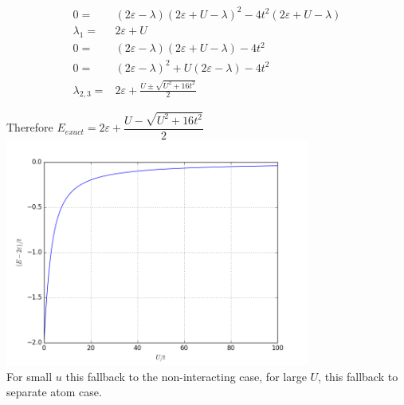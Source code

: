 \documentclass[10pt,fleqn]{article}
\newcommand{\eqar}[1]
{
  \begin{align*}
    #1
  \end{align*}
}
\newcommand{\paren}[1]{{\left({#1}\right)}}
\begin{document}
\subsection{}
\eqar{
  0=&\paren{2\varepsilon-\lambda}\paren{2\varepsilon+U-\lambda}^2-4t^2\paren{2\varepsilon+U-\lambda}\\
  \lambda_1=&2\varepsilon+U\\
  0=&\paren{2\varepsilon-\lambda}\paren{2\varepsilon+U-\lambda}-4t^2\\
  0=&\paren{2\varepsilon-\lambda}^2+U\paren{2\varepsilon-\lambda}-4t^2\\
  \lambda_{2,3}=&2\varepsilon+\frac{U\pm\sqrt{U^2+16t^2}}{2}
}
Therefore $E_{exact}=2\varepsilon+\dfrac{U-\sqrt{U^2+16t^2}}{2}$\\
\includegraphics[width=10cm]{4c.png}\\
For small $u$ this fallback to the non-interacting case, for large $U$, this fallback to separate atom case.
\end{document}
